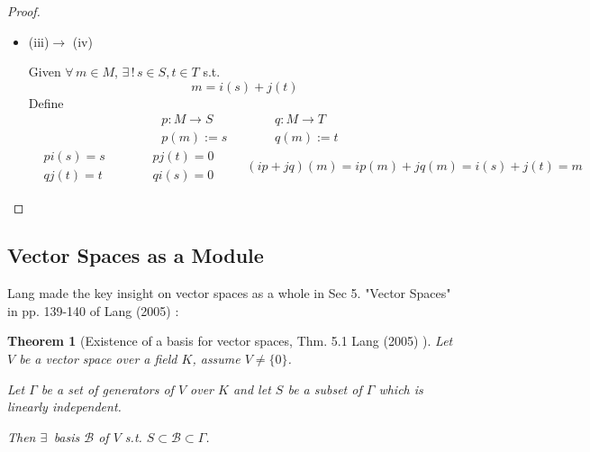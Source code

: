 \documentclass[10pt]{amsart}
\newtheorem{theorem}{Theorem}
\begin{document}
\begin{multicols*}{2}
\begin{proof}
\begin{itemize}
$\forall \, m \in M$, $m=i(s) + j(t)$ for some $s\in S,t\in T$.  

Suppose $\begin{aligned} & \quad \\ 
	& s' \in S \\
& t' \in T \end{aligned}$, s.t. $m=i(s'_ + j(t')$.  
\[
i(s-s') = j(t-t') \in \text{im}(i) \bigcap \text{im}(j) = \lbrace 0 \rbrace
\]
So $s=s',t=t'$, since $i,j$ injective.  
\item (iii)$\to$ (iv)   

Given $\forall \, m \in M$, $\exists \, ! \, s\in S,t\in T$ s.t. 
\[
m=i(s) + j(t)
\]
Define 
\[
\begin{aligned}
	& p:M \to S \\ 
	& p(m) := s
\end{aligned} \qquad \, \begin{aligned}
	& q: M \to T \\ 
	& q(m) := t
\end{aligned}
\]
\[
\begin{aligned}
	& pi(s) = s \\ 
	& qj(t) = t 
\end{aligned} \qquad \, \begin{aligned}
& pj(t) =0  \\
& qi(s) = 0 \end{aligned} \qquad \, 
(ip+jq)(m) = ip(m) + jq(m) = i(s) + j(t) = m 
\]
\end{itemize}
\end{proof}

\subsection{Vector Spaces as a Module}

Lang made the key insight on vector spaces as a whole in Sec 5. "Vector Spaces" in pp. 139-140 of Lang (2005) \cite{Lang2005}: 

\begin{theorem}[Existence of a basis for vector spaces, Thm. 5.1 Lang (2005) \cite{Lang2005}]\label{Thm:ExistenceOfBasisForVectorSpaces}
	Let $V$ be a vector space over a field $K$, assume $V \neq \lbrace 0 \rbrace$. 
	
	Let $\Gamma$ be a set of generators of $V$ over $K$ and let $S$ be a subset of $\Gamma$ which is linearly independent. 
	
	Then $\exists \, $ basis $\mathcal{B}$ of $V$ s.t. $S \subset \mathcal{B} \subset \Gamma$.


\end{theorem}
\end{multicols*}
\end{document}
